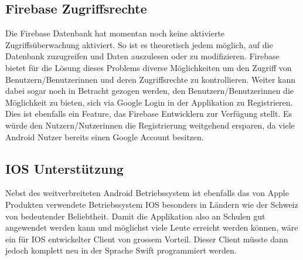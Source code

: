 \documentclass[a4paper,11pt]{report}
\begin{document}
		\subsection{Firebase Zugriffsrechte}
		Die Firebase Datenbank hat momentan noch keine aktivierte Zugriffsüberwachung aktiviert. So ist es theoretisch jedem möglich, auf die Datenbank zuzugreifen und Daten auszulesen oder zu modifizieren. Firebase bietet für die Lösung dieses Problems diverse Möglichkeiten um den Zugriff von Benutzern/Benutzerinnen und deren Zugriffsrechte zu kontrollieren. Weiter kann dabei sogar noch in Betracht gezogen werden, den Benutzern/Benutzerinnen die Möglichkeit zu bieten, sich via Google Login in der Applikation zu Registrieren. Dies ist ebenfalls ein Feature, das Firebase Entwicklern zur Verfügung stellt. Es würde den Nutzern/Nutzerinnen die Registrierung weitgehend ersparen, da viele Android Nutzer bereits einen Google Account besitzen.
		
		\subsection{IOS Unterstützung}
		Nebst des weitverbreiteten Android Betriebssystem ist ebenfalls das von Apple Produkten verwendete Betriebssystem IOS besonders in Ländern wie der Schweiz von bedeutender Beliebtheit. Damit die Applikation also an Schulen gut angewendet werden kann und möglichst viele Leute erreicht werden können, wäre ein für IOS entwickelter Client von grossem Vorteil. Dieser Client müsste dann jedoch komplett neu in der Sprache Swift programmiert werden.
		
		
		
		

\newpage
	
	
\end{document}
